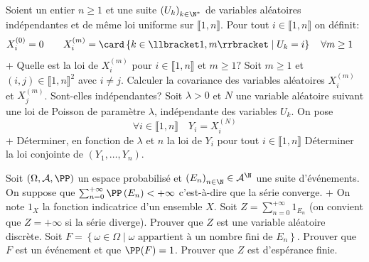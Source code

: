 \begin{exercise}
 Soient un entier $n \geqslant 1$ et une suite $\left(U_{k}\right)_{k \in \N^{*}}$  de variables aléatoires indépendantes et de même loi uniforme sur $\llbracket 1, n \rrbracket$. Pour tout $i \in \llbracket 1, n \rrbracket$ on définit:
\begin{equation*}\aligned
X_{i}^{(0)} &= 0 &&&
X_{i}^{(m)}&=\card\left\{k \in \llbracket 1, m \rrbracket \mid U_{k}=i\right\} \quad \forall m\geq1 
\endaligned
\end{equation*}
\question+ Quelle est la loi de $X_{i}^{(m)}$ pour $i \in \llbracket 1, n \rrbracket$ et $m \geqslant 1 ?$
\question Soit $m \geqslant 1$ et $(i, j) \in \llbracket 1, n \rrbracket^{2}$ avec $i \neq j $. Calculer la covariance des variables aléatoires $X_{i}^{(m)}$ et $X_{j}^{(m)}$. Sont-elles indépendantes?
\question Soit $\lambda>0$ et $N$ une variable aléatoire suivant une loi de Poisson de paramètre $\lambda$, indépendante des variables $U_{k}$. On pose
\begin{equation*}
\forall i \in \llbracket 1, n \rrbracket \quad Y_{i}=X_{i}^{(N)}
\end{equation*}
\question+ Déterminer, en fonction de $\lambda$ et $n$ la loi de $Y_{i}$ pour tout $i \in \llbracket 1, n \rrbracket$
\question Déterminer la loi conjointe de $\left(Y_{1}, \ldots, Y_{n}\right)$.
\endquestions 
\end{exercise}

\begin{exercise}[title=Centrale 2015] 
Soit $(\Omega, \mathcal{A}, \PP)$ un espace probabilisé et $\left(E_{n}\right)_{n \in \N} \in \mathcal{A}^{\N}$ une suite d'événements. On suppose que $\sum_{n=0}^{+\infty} \PP\left(E_{n}\right)<+\infty$ c'est-à-dire que la série converge.
\question+ On note $1_{X}$ la fonction indicatrice d'un ensemble $X $. Soit $Z=\sum_{n=0}^{+\infty} 1_{E_{n}}$ (on convient que $Z=+\infty$ si la série diverge). Prouver que $Z$ est une variable aléatoire discrète.
\question Soit $F=\left\{\omega \in \Omega \mid \omega\text{ appartient à un nombre fini de $E_{n}$}\right\}$. Prouver que $F$ est un événement et que $\PP(F)=1$.
\question Prouver que $Z$ est d'espérance finie.
\endquestions 
\end{exercise}


